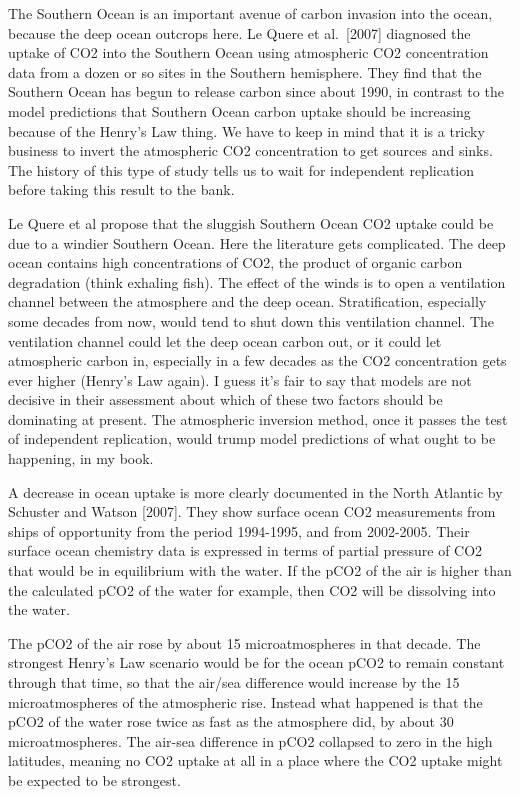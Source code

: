 \documentclass[
]{book}
\begin{document}
The Southern Ocean is an important avenue of carbon invasion into the ocean, because the deep ocean outcrops here. Le Quere et al.~{[}2007{]} diagnosed the uptake of CO2 into the Southern Ocean using atmospheric CO2 concentration data from a dozen or so sites in the Southern hemisphere. They find that the Southern Ocean has begun to release carbon since about 1990, in contrast to the model predictions that Southern Ocean carbon uptake should be increasing because of the Henry's Law thing. We have to keep in mind that it is a tricky business to invert the atmospheric CO2 concentration to get sources and sinks. The history of this type of study tells us to wait for independent replication before taking this result to the bank.

Le Quere et al propose that the sluggish Southern Ocean CO2 uptake could be due to a windier Southern Ocean. Here the literature gets complicated. The deep ocean contains high concentrations of CO2, the product of organic carbon degradation (think exhaling fish). The effect of the winds is to open a ventilation channel between the atmosphere and the deep ocean. Stratification, especially some decades from now, would tend to shut down this ventilation channel. The ventilation channel could let the deep ocean carbon out, or it could let atmospheric carbon in, especially in a few decades as the CO2 concentration gets ever higher (Henry's Law again). I guess it's fair to say that models are not decisive in their assessment about which of these two factors should be dominating at present. The atmospheric inversion method, once it passes the test of independent replication, would trump model predictions of what ought to be happening, in my book.

A decrease in ocean uptake is more clearly documented in the North Atlantic by Schuster and Watson {[}2007{]}. They show surface ocean CO2 measurements from ships of opportunity from the period 1994-1995, and from 2002-2005. Their surface ocean chemistry data is expressed in terms of partial pressure of CO2 that would be in equilibrium with the water. If the pCO2 of the air is higher than the calculated pCO2 of the water for example, then CO2 will be dissolving into the water.

The pCO2 of the air rose by about 15 microatmospheres in that decade. The strongest Henry's Law scenario would be for the ocean pCO2 to remain constant through that time, so that the air/sea difference would increase by the 15 microatmospheres of the atmospheric rise. Instead what happened is that the pCO2 of the water rose twice as fast as the atmosphere did, by about 30 microatmospheres. The air-sea difference in pCO2 collapsed to zero in the high latitudes, meaning no CO2 uptake at all in a place where the CO2 uptake might be expected to be strongest.
\end{document}
